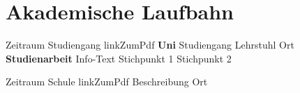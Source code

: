 \section*{Akademische Laufbahn}	

\medskip

\educationUni%
	{Zeitraum}
	{Studiengang}
	{linkZumPdf}
	{\textbf{Uni}%
		\newline
		Studiengang
		\newline 
		Lehrstuhl
	}	
	{Ort}
	{\textbf{Studienarbeit}%
		\newline
		Info-Text
		\newline \hspace*{0.3cm} \textbullet Stichpunkt 1
		\newline \hspace*{0.3cm} \textbullet Stichpunkt 2
	}
	{} %


	
\education%
	{Zeitraum}
	{Schule}
	{linkZumPdf}
	{Beschreibung}
	{Ort}

